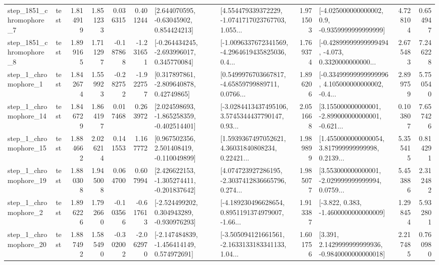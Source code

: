 \begin{tabular}{llrrrrllrlrr}
  step\_1851\_chromophore\_7 &      test &      1.814919 &    1.851233 &      0.036315 &  0.401244 &     [2.644070595, -0.63045902, 0.854424213] &  [4.554479339372229, -1.0741717023767703, 1.055... &       1.971503 &     [-4.025000000000002, 0.9, -0.9359999999999999] &            4.728104 &          0.654947 \\
  step\_1851\_chromophore\_8 &      test &      1.899165 &    1.711297 &     -0.187868 & -1.231651 &   [-0.264434245, -2.693996017, 0.345770084] &  [-1.0096337672341569, -4.2964619435825036, 0.4... &       1.769374 &  [-0.42899999999999494, -4.073, 0.3320000000000... &            2.675483 &          7.246228 \\
     step\_1\_chromophore\_1 &      test &      1.842674 &    1.559923 &     -0.282752 & -1.922757 &     [0.317897861, -2.809640878, 0.42749865] &  [0.5499976703667817, -4.65859799889711, 0.0766... &       1.896206 &  [-0.33499999999999996, 4.105000000000002, -0.4... &            2.899759 &          5.750540 \\
    step\_1\_chromophore\_14 &      test &      1.846729 &    1.864197 &      0.017468 &  0.263972 &   [2.024598693, -1.865258359, -0.402514401] &  [-3.0284413437495106, 3.5745344437790147, 0.93... &       2.051668 &  [3.155000000000001, -2.899000000000001, -0.621... &            0.103807 &          7.657426 \\
    step\_1\_chromophore\_15 &      test &      1.884662 &    2.026214 &      0.141553 &  1.167772 &    [0.967502356, 2.501408419, -0.110049899] &  [1.5939367497052621, 4.36031840808234, 0.22421... &       1.989899 &  [1.4550000000000054, 3.817999999999998, 0.2139... &            5.355415 &          0.814291 \\
    step\_1\_chromophore\_19 &      test &      1.880308 &    1.945008 &      0.064700 &  0.607994 &   [2.426622153, -1.305274411, -0.201837642] &  [4.074723927286195, -2.3037412836665796, 0.274... &       1.985077 &  [3.553000000000001, -2.029999999999994, 0.0759... &            5.453886 &          2.312482 \\
     step\_1\_chromophore\_2 &      test &      1.896226 &    1.792660 &     -0.103566 & -0.617613 &   [-2.524499202, 0.304943289, -0.930976293] &  [-4.189230496628654, 0.8951191374979007, -1.66... &       1.913387 &               [-3.822, 0.383, -1.4600000000000009] &            1.298454 &          5.932801 \\
    step\_1\_chromophore\_20 &      test &      1.887492 &    1.585490 &     -0.302002 & -2.062970 &   [-2.147484839, -1.456414149, 0.574972691] &  [-3.505094121661561, -2.1633133183341133, 1.04... &       1.601756 &   [3.391, 2.1429999999999936, -0.9840000000000018] &            2.217485 &          0.760980 \\

\end{tabular}
